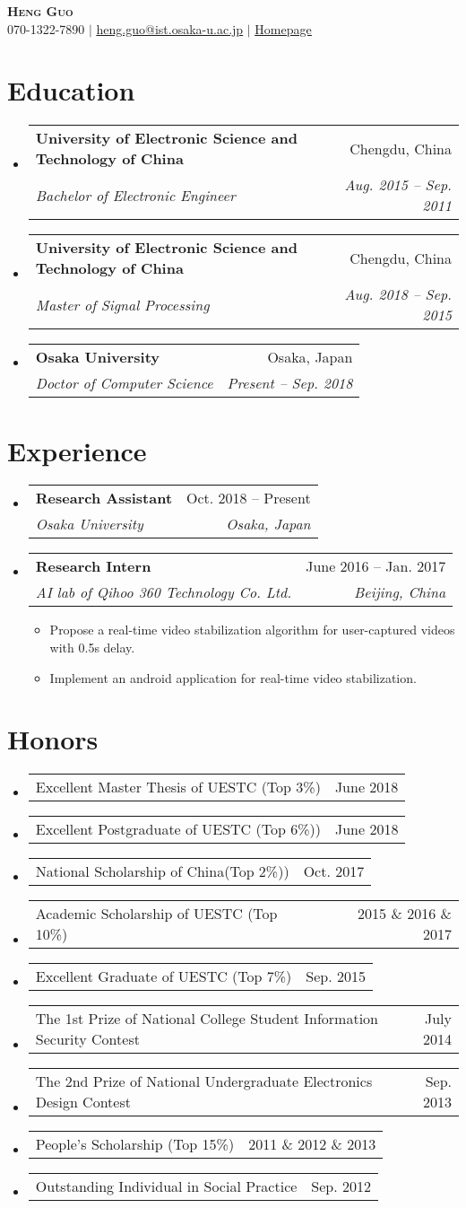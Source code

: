 \documentclass[letterpaper,11pt]{article}
\makeatletter
\newcommand{\resumeItem}[1]{
  \item\small{
    {#1 \vspace{-2pt}}
  }
}
\newcommand{\resumeSubheading}[4]{
  \vspace{-2pt}\item
    \begin{tabular*}{0.97\textwidth}[t]{l@{\extracolsep{\fill}}r}
      \textbf{#1} & #2 \\
      \textit{\small#3} & \textit{\small #4} \\
    \end{tabular*}\vspace{-7pt}
}
\newcommand{\resumeProjectHeading}[2]{
    \item
    \begin{tabular*}{0.97\textwidth}{l@{\extracolsep{\fill}}r}
      \small#1 & #2 \\
    \end{tabular*}\vspace{-7pt}
}
\newcommand{\resumeSubHeadingListStart}{\begin{itemize}[leftmargin=0.15in, label={}]}
\newcommand{\resumeSubHeadingListEnd}{\end{itemize}}
\newcommand{\resumeItemListStart}{\begin{itemize}}
\newcommand{\resumeItemListEnd}{\end{itemize}\vspace{-5pt}}
\makeatother
\begin{document}
\begin{center}
    \textbf{\Huge \scshape  Heng Guo} \\ \vspace{4pt}
    \small 070-1322-7890 $|$ \href{mailto:heng.guo@ist.osaka-u.ac.jp}{\underline{heng.guo@ist.osaka-u.ac.jp}} $|$ 
    \href{https://gh-home.github.io/}{\underline{Homepage}}
\end{center}


\section{Education}
  \resumeSubHeadingListStart
    \resumeSubheading
      {University of Electronic Science and Technology of China }{Chengdu, China}
      {Bachelor of Electronic Engineer}{Aug. 2015 -- Sep. 2011}
  \resumeSubheading
      {University of Electronic Science and Technology of China }{Chengdu, China}
      {Master of Signal Processing}{Aug. 2018 -- Sep. 2015}
   \resumeSubheading
 		{Osaka University}{Osaka, Japan}
 		{Doctor of Computer Science}{Present -- Sep. 2018}
  \resumeSubHeadingListEnd


\section{Experience}
  \resumeSubHeadingListStart
    \resumeSubheading
      {Research Assistant}{Oct. 2018 -- Present}
      {Osaka University}{Osaka, Japan}
      
    \resumeSubheading
     {Research Intern}{June 2016 -- Jan. 2017}
	{AI lab of Qihoo 360 Technology Co. Ltd.}{Beijing, China}
     \resumeItemListStart
		\resumeItem{Propose a real-time video stabilization algorithm for user-captured videos with 0.5s delay.}
		\resumeItem{Implement an android application for real-time video stabilization.}
     \resumeItemListEnd

  \resumeSubHeadingListEnd


\section{Honors}
    \resumeSubHeadingListStart
      \resumeProjectHeading
          {Excellent Master Thesis of UESTC (Top 3\%)}{June 2018}
   
         \resumeProjectHeading
   {Excellent Postgraduate of UESTC (Top 6\%))}{June 2018}
         \resumeProjectHeading
   {National Scholarship of China(Top 2\%))}{Oct. 2017}
         \resumeProjectHeading
   {Academic Scholarship of UESTC (Top 10\%)}{2015 \& 2016 \& 2017}
         \resumeProjectHeading
   {Excellent Graduate of UESTC (Top 7\%)}{Sep. 2015}
         \resumeProjectHeading
   {The 1st Prize of National College Student Information Security Contest}{July 2014}
            \resumeProjectHeading
   {The 2nd Prize of National Undergraduate Electronics Design Contest}{Sep. 2013}
   \resumeProjectHeading
   {People's Scholarship (Top 15\%)}{2011 \& 2012 \& 2013}
   \resumeProjectHeading
   {Outstanding Individual in Social Practice}{Sep. 2012}
    \resumeSubHeadingListEnd
\end{document}
